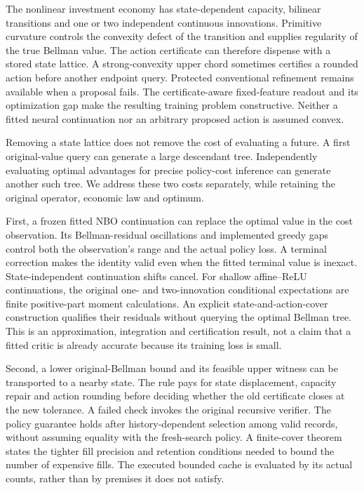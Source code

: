 \documentclass[ecta,nameyear,draft]{econsocart}
\begin{document}
The nonlinear investment economy has state-dependent capacity, bilinear transitions and one or two independent continuous innovations. Primitive curvature controls the convexity defect of the transition and supplies regularity of the true Bellman value. The action certificate can therefore dispense with a stored state lattice. A strong-convexity upper chord sometimes certifies a rounded action before another endpoint query. Protected conventional refinement remains available when a proposal fails. The certificate-aware fixed-feature readout and its optimization gap make the resulting training problem constructive. Neither a fitted neural continuation nor an arbitrary proposed action is assumed convex.

Removing a state lattice does not remove the cost of evaluating a future. A first original-value query can generate a large descendant tree. Independently evaluating optimal advantages for precise policy-cost inference can generate another such tree. We address these two costs separately, while retaining the original operator, economic law and optimum.

First, a frozen fitted NBO continuation can replace the optimal value in the cost observation. Its Bellman-residual oscillations and implemented greedy gaps control both the observation's range and the actual policy loss. A terminal correction makes the identity valid even when the fitted terminal value is inexact. State-independent continuation shifts cancel. For shallow affine--ReLU continuations, the original one- and two-innovation conditional expectations are finite positive-part moment calculations. An explicit state-and-action-cover construction qualifies their residuals without querying the optimal Bellman tree. This is an approximation, integration and certification result, not a claim that a fitted critic is already accurate because its training loss is small.

Second, a lower original-Bellman bound and its feasible upper witness can be transported to a nearby state. The rule pays for state displacement, capacity repair and action rounding before deciding whether the old certificate closes at the new tolerance. A failed check invokes the original recursive verifier. The policy guarantee holds after history-dependent selection among valid records, without assuming equality with the fresh-search policy. A finite-cover theorem states the tighter fill precision and retention conditions needed to bound the number of expensive fills. The executed bounded cache is evaluated by its actual counts, rather than by premises it does not satisfy.
\end{document}
